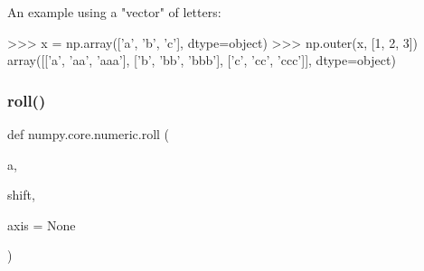 \begin{DoxyVerb}
An example using a "vector" of letters:

>>> x = np.array(['a', 'b', 'c'], dtype=object)
>>> np.outer(x, [1, 2, 3])
array([['a', 'aa', 'aaa'],
       ['b', 'bb', 'bbb'],
       ['c', 'cc', 'ccc']], dtype=object)\end{DoxyVerb}
 \mbox{\label{namespacenumpy_1_1core_1_1numeric_a5503974a131efadeeec73bf5eba4b43f}} 
\subsubsection{\texorpdfstring{roll()}{roll()}}
{\footnotesize\ttfamily def numpy.\+core.\+numeric.\+roll (\begin{DoxyParamCaption}\item[{}]{a,  }\item[{}]{shift,  }\item[{}]{axis = {\ttfamily None} }\end{DoxyParamCaption})}

